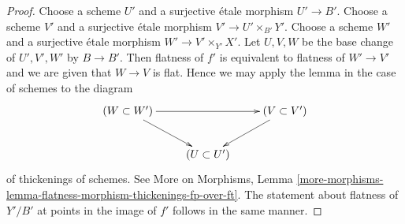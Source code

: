 \documentclass[10pt,a4paper]{amsart}
\theoremstyle{plain}
\theoremstyle{definition}
\theoremstyle{remark}
\numberwithin{equation}{subsection}
\begin{document}
\begin{proof}
Choose a scheme $U'$ and a surjective \'etale morphism $U' \to B'$.
Choose a scheme $V'$ and a surjective \'etale morphism
$V' \to U' \times_{B'} Y'$.
Choose a scheme $W'$ and a surjective \'etale morphism
$W' \to V' \times_{Y'} X'$. Let $U, V, W$ be the base change
of $U', V', W'$ by $B \to B'$. Then flatness of $f'$ is
equivalent to flatness of $W' \to V'$ and we are
given that $W \to V$ is flat. Hence we may apply the lemma
in the case of schemes to the diagram
$$
\xymatrix{
(W \subset W') \ar[rr] \ar[rd] & & (V \subset V') \ar[ld] \\
& (U \subset U')
}
$$
of thickenings of schemes. See
More on Morphisms, Lemma
\ref{more-morphisms-lemma-flatness-morphism-thickenings-fp-over-ft}.
The statement about flatness of $Y'/B'$ at points in the
image of $f'$ follows in the same manner.
\end{proof}
\end{document}
